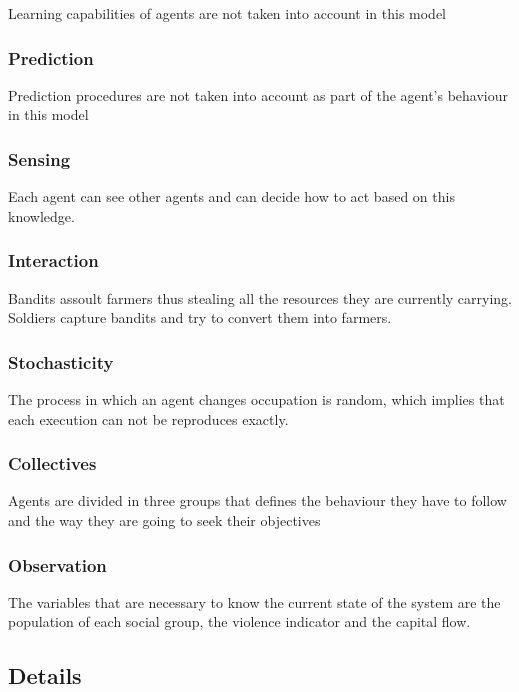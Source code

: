 \documentclass{wscpaperproc}
\theoremstyle{wsc}
\begin{document}
Learning capabilities of agents are not taken into account in this model

\subsubsection{Prediction}

Prediction procedures are not taken into account as part of the agent's
behaviour in this model

\subsubsection{Sensing}

Each agent can see other agents and can decide how to act based on this
knowledge.

\subsubsection{Interaction}

Bandits assoult farmers thus stealing all the resources they are currently
carrying. Soldiers capture bandits and try to convert them into farmers.

\subsubsection{Stochasticity}

The process in which an agent changes occupation is random, which implies that
each execution can not be reproduces exactly.

\subsubsection{Collectives}

Agents are divided in three groups that defines the behaviour they have to
follow and the way they are going to seek their objectives

\subsubsection{Observation}

The variables that are necessary to know the current state of the system are
the population of each social group, the violence indicator and the capital
flow.

\subsection{Details}
\end{document}
